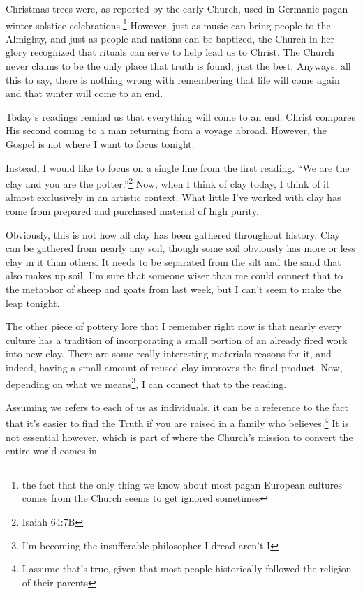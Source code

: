 \documentclass[12pt]{article}[titlepage]
\newcommand{\say}[1]{``#1''}
\newcommand{\1}{\={a}}
\newcommand{\2}{\={e}}
\newcommand{\3}{\={\i}}
\newcommand{\4}{\=o}
\newcommand{\5}{\=u}
\newcommand{\6}{\={A}}
\renewcommand{\,}{\textsuperscript{,}}
\begin{document}
Christmas trees were, as reported by the early Church, used in Germanic pagan winter solstice celebrations.\footnote{the fact that the only thing we know about most pagan European cultures comes from the Church seems to get ignored sometimes}
However, just as music can bring people to the Almighty, and just as people and nations can be baptized, the Church in her glory recognized that rituals can serve to help lead us to Christ.
The Church never claims to be the only place that truth is found, just the best.
Anyways, all this to say, there is nothing wrong with remembering that life will come again and that winter will come to an end.

Today's readings remind us that everything will come to an end.
Christ compares His second coming to a man returning from a voyage abroad.
However, the Gospel is not where I want to focus tonight.

Instead, I would like to focus on a single line from the first reading.
\say{We are the clay and you are the potter.}\footnote{Isaiah 64:7B}
Now, when I think of clay today, I think of it almost exclusively in an artistic context.
What little I've worked with clay has come from prepared and purchased material of high purity.

Obviously, this is not how all clay has been gathered throughout history.
Clay can be gathered from nearly any soil, though some soil obviously has more or less clay in it than others.
It needs to be separated from the silt and the sand that also makes up soil.
I'm sure that someone wiser than me could connect that to the metaphor of sheep and goats from last week, but I can't seem to make the leap tonight.

The other piece of pottery lore that I remember right now is that nearly every culture has a tradition of incorporating a small portion of an already fired work into new clay.
There are some really interesting materials reasons for it, and indeed, having a small amount of reused clay improves the final product.
Now, depending on what we means\footnote{I'm becoming the insufferable philosopher I dread aren't I}, I can connect that to the reading.

Assuming we refers to each of us as individuals, it can be a reference to the fact that it's easier to find the Truth if you are raised in a family who believes.\footnote{I assume that's true, given that most people historically followed the religion of their parents}
It is not essential however, which is part of where the Church's mission to convert the entire world comes in.
\end{document}
